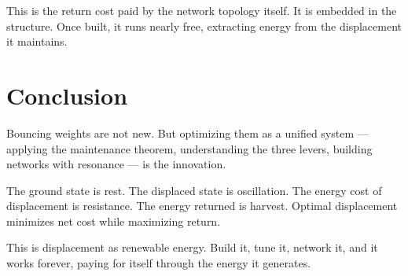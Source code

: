 \documentclass[12pt]{article}
\begin{document}
This is the return cost paid by the network topology itself. It is embedded in the structure. Once built, it runs nearly free, extracting energy from the displacement it maintains.

\section{Conclusion}

Bouncing weights are not new. But optimizing them as a unified system — applying the maintenance theorem, understanding the three levers, building networks with resonance — is the innovation.

The ground state is rest. The displaced state is oscillation. The energy cost of displacement is resistance. The energy returned is harvest. Optimal displacement minimizes net cost while maximizing return.

This is displacement as renewable energy. Build it, tune it, network it, and it works forever, paying for itself through the energy it generates.
\end{document}
